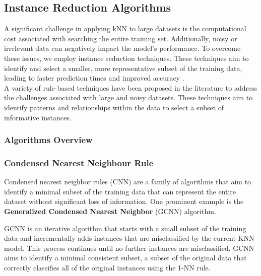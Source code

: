 
\subsection{Instance Reduction Algorithms}
\label{subsec:methods-reduction}

A significant challenge in applying kNN to large datasets is the computational cost 
associated with searching the entire training set. Additionally, noisy or irrelevant 
data can negatively impact the model's performance. 
To overcome these issues, we employ instance reduction techniques. 
These techniques aim to identify and select a smaller, more representative subset of
the training data, leading to faster prediction times and improved accuracy \cite{Wilson2000}.\\

A variety of rule-based techniques have been proposed in the literature to 
address the challenges associated with large and noisy datasets. 
These techniques aim to identify patterns and relationships within the data to select 
a subset of informative instances.

\subsubsection{Algorithms Overview}

\subsubsection*{Condensed Nearest Neighbour Rule}
Condensed nearest neighbor rules (CNN) are a family of algorithms that aim to identify 
a minimal subset of the training data that can represent the entire dataset without 
significant loss of information. One prominent example is the \textbf{Generalized Condensed 
Nearest Neighbor} (GCNN) algorithm.

GCNN \cite{hart1968condensed} is an iterative algorithm that starts with a small subset of 
the training data and incrementally adds instances that are misclassified by the current KNN model. 
This process continues until no further instances are misclassified. GCNN aims to identify a minimal 
consistent subset, a subset of the original data that correctly classifies all of the original 
instances using the 1-NN rule.

